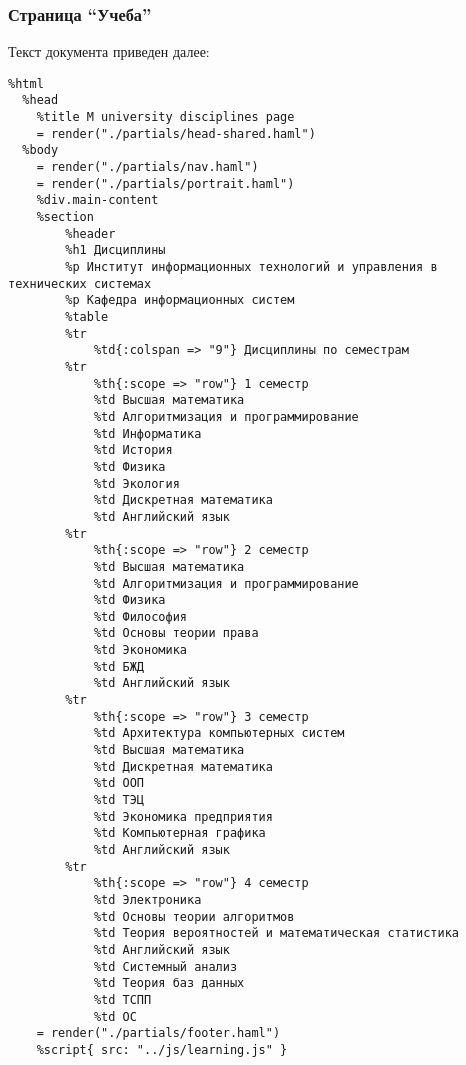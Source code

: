\documentclass[a4paper,14pt]{extarticle}
\begin{document}
\subsubsection{Страница \enquote{Учеба}}
Текст документа  приведен далее:
\begin{lstlisting}
%html
  %head
    %title M university disciplines page
    = render("./partials/head-shared.haml")
  %body
    = render("./partials/nav.haml")
    = render("./partials/portrait.haml")
    %div.main-content
    %section
        %header
        %h1 Дисциплины
        %p Институт информационных технологий и управления в технических системах
        %p Кафедра информационных систем
        %table
        %tr
            %td{:colspan => "9"} Дисциплины по семестрам
        %tr
            %th{:scope => "row"} 1 семестр
            %td Высшая математика
            %td Алгоритмизация и программирование
            %td Информатика
            %td История
            %td Физика
            %td Экология
            %td Дискретная математика
            %td Английский язык
        %tr
            %th{:scope => "row"} 2 семестр
            %td Высшая математика
            %td Алгоритмизация и программирование
            %td Физика
            %td Философия
            %td Основы теории права
            %td Экономика
            %td БЖД
            %td Английский язык
        %tr
            %th{:scope => "row"} 3 семестр
            %td Архитектура компьютерных систем
            %td Высшая математика
            %td Дискретная математика
            %td ООП
            %td ТЭЦ
            %td Экономика предприятия
            %td Компьютерная графика
            %td Английский язык
        %tr
            %th{:scope => "row"} 4 семестр
            %td Электроника
            %td Основы теории алгоритмов
            %td Теория вероятностей и математическая статистика
            %td Английский язык
            %td Системный анализ
            %td Теория баз данных
            %td ТСПП
            %td ОС
    = render("./partials/footer.haml")
    %script{ src: "../js/learning.js" }
\end{lstlisting}
\end{document}
